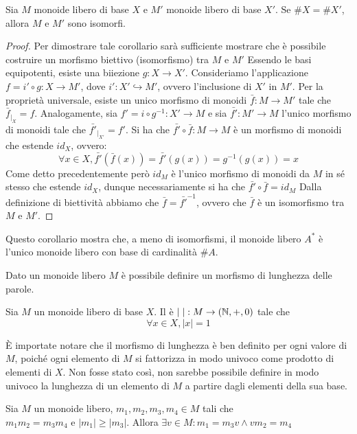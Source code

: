 \begin{corollary}
  Sia \(M\) monoide libero di base \(X\) e \(M'\) monoide libero di base \(X'\).
  Se \(\#X = \#X'\), allora \(M\) e \(M'\) sono isomorfi.
\end{corollary}

\begin{proof}
  Per dimostrare tale corollario sarà sufficiente mostrare che è possibile costruire un morfismo biettivo (isomorfismo) tra \(M\) e \(M'\)
  Essendo le basi equipotenti, esiste una biiezione \(g: X \to X'\).
  Consideriamo l'applicazione \(f = i' \circ g : X \to M'\), dove \(i': X' \hookrightarrow M'\), ovvero l'inclusione di \(X'\) in \(M'\).
  Per la proprietà universale, esiste un unico morfismo di monoidi \(\bar{f}: M \to M'\) tale che \(\bar{f}_{|_X} = f\).
  Analogamente, sia \(f'= i \circ g^{-1} : X' \to M\) e sia \(\bar{f'}: M' \to M\) l'unico morfismo di monoidi tale che \(\bar{f'}_{|_{X'}} = f'\).
  Si ha che \(\bar{f'} \circ \bar{f}: M \to M\) è un morfismo di monoidi che estende \(id_X\), ovvero:
  \[\forall x \in X, \bar{f'} (\bar{f}(x)) = \bar{f'}(g(x))= g^{-1}(g(x))= x\]
  Come detto precedentemente però \(id_M\) è l'unico morfismo di monoidi da \(M\) in sé stesso che estende \(id_X\), dunque necessariamente si ha che \(\bar{f'} \circ \bar{f} = id_M\)
  Dalla definizione di biettività abbiamo che \(\bar{f} = \bar{f'}^{-1} \), ovvero che \(\bar{f}\) è un isomorfismo tra \(M\) e \(M'\). 
\end{proof}
Questo corollario mostra che, a meno di isomorfismi, il monoide libero \(A^*\) è l'unico monoide libero con base di cardinalità \(\#A\).

Dato un monoide libero \(M\) è possibile definire un morfismo di lunghezza delle parole.
\begin{definition}
  Sia \(M\) un monoide libero di base \(X\).
  Il  è \(|\;|: M \to(\mathbb{N},+,0)\) tale che \[\forall x \in X, |x| = 1\]
\end{definition}

\begin{note}
  È importate notare che il morfismo di lunghezza è ben definito per ogni valore di \(M\), poiché ogni elemento di \(M\) si fattorizza in modo univoco come prodotto di elementi di \(X\).
  Non fosse stato così, non sarebbe possibile definire in modo univoco la lunghezza di un elemento di \(M\) a partire dagli elementi della sua base.
\end{note}

\begin{lemma}[Levi]\label{thm:levi}
  Sia \(M\) un monoide libero, \(m_1,m_2,m_3,m_4 \in M\) tali che \(m_1m_2=m_3m_4 \text{ e } |m_1| \geq |m_3|\).
  Allora \(\exists v \in M: m_1 = m_3v \land vm_2 = m_4\)
\end{lemma}


